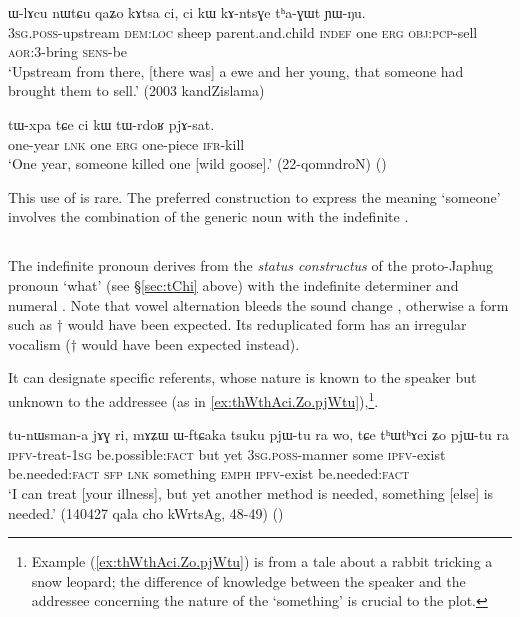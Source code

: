 \begin{exe}
\ex \label{ci.kW.thaGWt}
\gll ɯ-lɤcu nɯtɕu qaʑo kɤtsa ci, ci kɯ kɤ-ntsɣe tʰa-ɣɯt ɲɯ-ŋu. \\
\textsc{3sg}.\textsc{poss}-upstream \textsc{dem}:\textsc{loc} sheep parent.and.child \textsc{indef} one \textsc{erg} \textsc{obj}:\textsc{pcp}-sell \textsc{aor}:3\flobv{}-bring \textsc{sens}-be \\
\glt `Upstream from there, [there was] a ewe and her young, that someone had brought them to sell.' (2003 kandZislama)
\end{exe}

\begin{exe}
\ex \label{ci.kW.tWrdoR}
\gll  tɯ-xpa tɕe ci kɯ tɯ-rdoʁ pjɤ-sat. \\
 one-year \textsc{lnk} one \textsc{erg} one-piece \textsc{ifr}-kill \\
 \glt `One year, someone killed one [wild goose].' (22-qomndroN) ()
\end{exe}

This use of  is rare. The preferred construction to express the meaning `someone' involves the combination of the generic noun  with the indefinite .

\subsection{ } \label{sec:thWci} 
The indefinite pronoun  derives from the \textit{status constructus} of the proto-Japhug pronoun  `what' (see §\ref{sec:tChi} above) with the indefinite determiner and numeral . Note that vowel alternation bleeds the sound change  \fl{}  , otherwise a form such as $\dagger$ would have been expected. Its reduplicated form  has an irregular vocalism  ($\dagger$ would have been expected instead).

 It can designate specific referents, whose nature is known to the speaker but unknown to the addressee (as in \ref{ex:thWthAci.Zo.pjWtu}),\footnote{Example (\ref{ex:thWthAci.Zo.pjWtu}) is from a tale about a rabbit tricking a snow leopard; the difference of knowledge between the speaker and the addressee concerning the nature of the `something' is crucial to the plot. }.

\begin{exe}
\ex  \label{ex:thWthAci.Zo.pjWtu}
\gll tu-nɯsman-a jɤɣ ri, mɤʑɯ ɯ-ftɕaka tsuku pjɯ-tu ra wo, tɕe tʰɯtʰɤci ʑo pjɯ-tu ra \\
\textsc{ipfv}-treat-\textsc{1sg} be.possible:\textsc{fact} but yet \textsc{3sg}.\textsc{poss}-manner some \textsc{ipfv}-exist be.needed:\textsc{fact} \textsc{sfp} \textsc{lnk} something \textsc{emph} \textsc{ipfv}-exist be.needed:\textsc{fact} \\
\glt `I can treat [your illness], but yet another method is needed, something [else] is needed.'  (140427 qala cho kWrtsAg, 48-49) ()
\end{exe}

